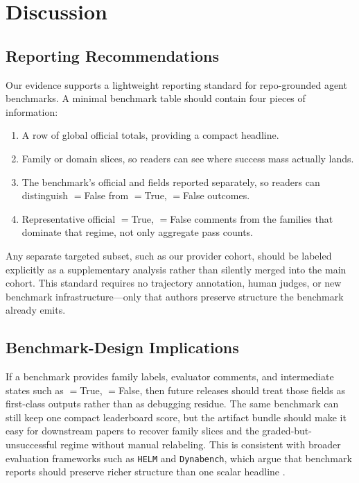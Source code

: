 \section{Discussion}

\subsection{Reporting Recommendations}

Our evidence supports a lightweight reporting standard for repo-grounded agent
benchmarks. A minimal benchmark table should contain four pieces of
information:
\begin{enumerate}[leftmargin=1.25em]
\item A row of global official totals, providing a compact headline.
\item Family or domain slices, so readers can see where success mass
actually lands.
\item The benchmark's official \processmetric and \resultmetric fields reported
separately, so readers can distinguish \processmetric$=$False from
\processmetric$=$True, \resultmetric$=$False outcomes.
\item Representative official \processmetric$=$True, \resultmetric$=$False
comments from the families that dominate that regime, not only aggregate pass
counts.
\end{enumerate}

\noindent Any separate targeted subset, such as our provider cohort, should be
labeled explicitly as a supplementary analysis rather than silently merged into
the main cohort. This standard requires no trajectory annotation, human judges,
or new benchmark infrastructure---only that authors preserve structure the
benchmark already emits.

\subsection{Benchmark-Design Implications}

If a benchmark provides family labels, evaluator comments, and intermediate
states such as \processmetric$=$True, \resultmetric$=$False, then future
releases should treat those fields as first-class outputs rather than as
debugging residue. The same benchmark can still keep one compact leaderboard
score, but the artifact bundle should make it easy for downstream papers to
recover family slices and the graded-but-unsuccessful regime without manual
relabeling. This is consistent with broader evaluation frameworks such as
\texttt{HELM} and \texttt{Dynabench}, which argue that benchmark reports should
preserve richer structure than one scalar headline \cite{helm,dynabench}.


